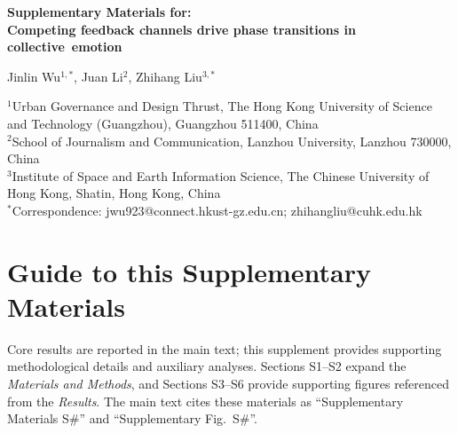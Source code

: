 \documentclass[11pt]{article}
\begin{document}
\linenumbers %

\begin{center}
{\LARGE\bfseries Supplementary Materials for:\\
Competing feedback channels drive phase transitions in collective~emotion}

\vspace{1em}

{\large Jinlin Wu$^{1,\ast}$, Juan Li$^{2}$, Zhihang Liu$^{3,\ast}$}

\vspace{0.5em}

{\small
$^{1}$Urban Governance and Design Thrust, The Hong Kong University of Science and Technology (Guangzhou), Guangzhou 511400, China\\
$^{2}$School of Journalism and Communication, Lanzhou University, Lanzhou 730000, China\\
$^{3}$Institute of Space and Earth Information Science, The Chinese University of Hong Kong, Shatin, Hong Kong, China\\[0.3em]
$^\ast$Correspondence: jwu923@connect.hkust-gz.edu.cn; zhihangliu@cuhk.edu.hk
}
\end{center}

\vspace{1em}

\renewcommand{\contentsname}{Supplementary Contents}
\setcounter{tocdepth}{2}
\tableofcontents
\clearpage
\FloatBarrier

\section*{Guide to this Supplementary Materials}
Core results are reported in the main text; this supplement provides supporting methodological details and auxiliary analyses. Sections S1--S2 expand the \emph{Materials and Methods}, and Sections S3--S6 provide supporting figures referenced from the \emph{Results}. The main text cites these materials as ``Supplementary Materials S\#'' and ``Supplementary Fig.~S\#''.
\end{document}
